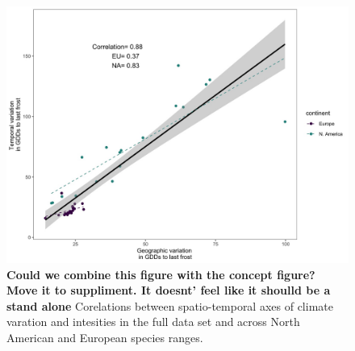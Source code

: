 \documentclass[12pt]{article}\usepackage[]{graphicx}\usepackage[]{color}
\begin{document}
\begin{figure}[h!]
    \centering
 \includegraphics[width=\textwidth]{..//..//analyses/ranges/figures/clim_params.jpeg} 
    \caption{\textbf{Could we combine this figure with the concept figure? Move it to suppliment. It doesnt' feel like it shoulld be a stand alone} Corelations between spatio-temporal axes of climate varation and intesities in the full data set and across North American and European species ranges.}%
    \label{fig:corrs}
\end{figure}
\end{document}
